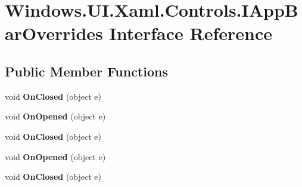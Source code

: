 \hypertarget{interface_windows_1_1_u_i_1_1_xaml_1_1_controls_1_1_i_app_bar_overrides}{}\section{Windows.\+U\+I.\+Xaml.\+Controls.\+I\+App\+Bar\+Overrides Interface Reference}
\label{interface_windows_1_1_u_i_1_1_xaml_1_1_controls_1_1_i_app_bar_overrides}
\subsection*{Public Member Functions}
\begin{DoxyCompactItemize}
\item 
\mbox{\label{interface_windows_1_1_u_i_1_1_xaml_1_1_controls_1_1_i_app_bar_overrides_ae6cf198b7cd78c76b94fbd05c8a1eb4e}} 
void {\bfseries On\+Closed} (object e)
\item 
\mbox{\label{interface_windows_1_1_u_i_1_1_xaml_1_1_controls_1_1_i_app_bar_overrides_a5f15620e64137a972d69545b7ee2f08d}} 
void {\bfseries On\+Opened} (object e)
\item 
\mbox{\label{interface_windows_1_1_u_i_1_1_xaml_1_1_controls_1_1_i_app_bar_overrides_ae6cf198b7cd78c76b94fbd05c8a1eb4e}} 
void {\bfseries On\+Closed} (object e)
\item 
\mbox{\label{interface_windows_1_1_u_i_1_1_xaml_1_1_controls_1_1_i_app_bar_overrides_a5f15620e64137a972d69545b7ee2f08d}} 
void {\bfseries On\+Opened} (object e)
\item 
\mbox{\label{interface_windows_1_1_u_i_1_1_xaml_1_1_controls_1_1_i_app_bar_overrides_ae6cf198b7cd78c76b94fbd05c8a1eb4e}} 
void {\bfseries On\+Closed} (object e)
\item 
\mbox{\label{interface_windows_1_1_u_i_1_1_xaml_1_1_controls_1_1_i_app_bar_overrides_a5f15620e64137a972d69545b7ee2f08d}} 

\end{DoxyCompactItemize}
